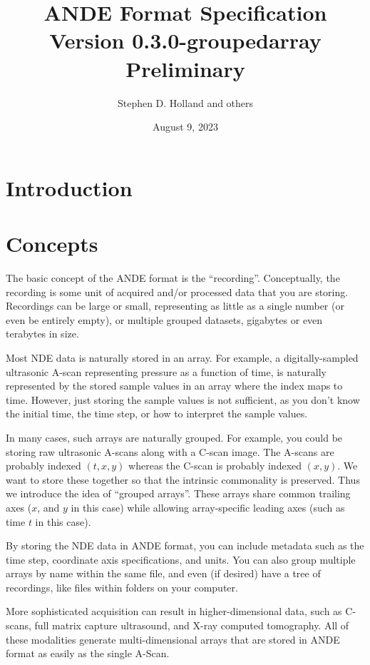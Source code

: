 \documentclass{article}
\title{ANDE Format Specification Version 0.3.0-groupedarray Preliminary}
\author{Stephen D. Holland and others}
\date{August 9, 2023}
\begin{document}
\maketitle

\section{Introduction}

\section{Concepts}

The basic concept of the ANDE format is the ``recording''. Conceptually, the recording is some unit of acquired and/or processed data that you are storing. Recordings can be large or small, representing as little as a single number (or even be entirely empty), or multiple grouped datasets, gigabytes or even terabytes in size.

Most NDE data is naturally stored in an array. For example, a digitally-sampled ultrasonic A-scan representing pressure as a function of time, is naturally represented by the stored sample values in an array where the index maps to time. However, just storing the sample values is not sufficient, as you don't know the initial time, the time step, or how to interpret the sample values.

In many cases, such arrays are naturally grouped. For example, you could be storing raw ultrasonic A-scans along with a C-scan image. The A-scans are probably indexed $(t,x,y)$ whereas the C-scan is probably indexed $(x,y)$. We want to store these together so that the intrinsic commonality is preserved. Thus we introduce the idea of ``grouped arrays''. These arrays share common trailing axes ($x$, and $y$ in this case) while allowing array-specific leading axes (such as time $t$ in this case). 

By storing the NDE data in ANDE format, you can include metadata such as the time step, coordinate axis specifications, and units. You can also group multiple arrays by name within the same file, and even (if desired) have a tree of recordings, like files within folders on your computer.

More sophisticated acquisition can result in higher-dimensional data, such as C-scans, full matrix capture ultrasound, and X-ray computed tomography. All of these modalities generate multi-dimensional arrays that are stored in ANDE format as easily as the single A-Scan.
\end{document}
